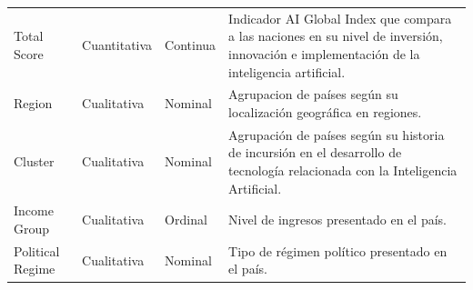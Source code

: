 \documentclass[
]{article}
\begin{document}
\begin{footnotesize}
\begin{longtable}[t]{lllp{8cm}}
Total Score & Cuantitativa & Continua & Indicador AI Global Index que compara a las naciones en su nivel de inversión, innovación e implementación de la inteligencia artificial.\\
Region & Cualitativa & Nominal & Agrupacion de países según su localización geográfica en regiones.\\
\addlinespace
Cluster & Cualitativa & Nominal & Agrupación de países según su historia de incursión en el desarrollo de tecnología relacionada con la Inteligencia Artificial.\\
Income Group & Cualitativa & Ordinal & Nivel de ingresos presentado en el país.\\
Political Regime & Cualitativa & Nominal & Tipo de régimen político presentado en el país.\\
\bottomrule
\end{longtable}

\end{footnotesize}\renewcommand{\arraystretch}{1}
\end{document}

